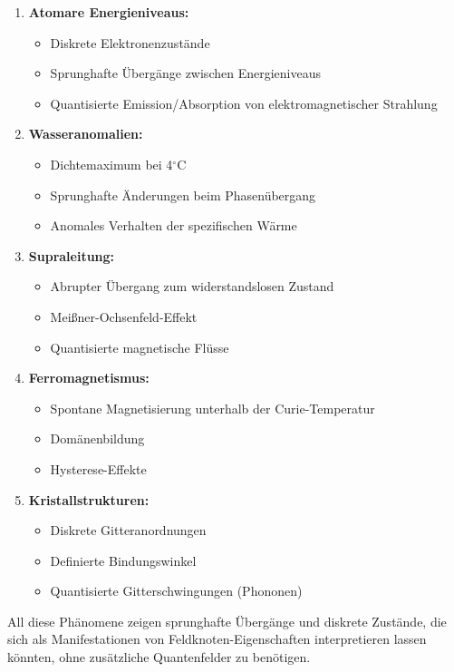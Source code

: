 \documentclass[12pt,a4paper]{article}
\begin{document}
	\begin{enumerate}
		\item \textbf{Atomare Energieniveaus:}
		\begin{itemize}
			\item Diskrete Elektronenzustände
			\item Sprunghafte Übergänge zwischen Energieniveaus
			\item Quantisierte Emission/Absorption von elektromagnetischer Strahlung
		\end{itemize}
		\item \textbf{Wasseranomalien:}
		\begin{itemize}
			\item Dichtemaximum bei 4$^\circ$C
			\item Sprunghafte Änderungen beim Phasenübergang
			\item Anomales Verhalten der spezifischen Wärme
		\end{itemize}
		\item \textbf{Supraleitung:}
		\begin{itemize}
			\item Abrupter Übergang zum widerstandslosen Zustand
			\item Meißner-Ochsenfeld-Effekt
			\item Quantisierte magnetische Flüsse
		\end{itemize}
		\item \textbf{Ferromagnetismus:}
		\begin{itemize}
			\item Spontane Magnetisierung unterhalb der Curie-Temperatur
			\item Domänenbildung
			\item Hysterese-Effekte
		\end{itemize}
		\item \textbf{Kristallstrukturen:}
		\begin{itemize}
			\item Diskrete Gitteranordnungen
			\item Definierte Bindungswinkel
			\item Quantisierte Gitterschwingungen (Phononen)
		\end{itemize}
	\end{enumerate}
	
	All diese Phänomene zeigen sprunghafte Übergänge und diskrete Zustände, die sich als Manifestationen von Feldknoten-Eigenschaften interpretieren lassen könnten, ohne zusätzliche Quantenfelder zu benötigen.
	
\end{document}
